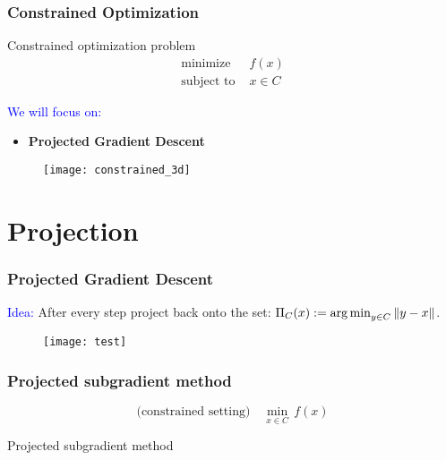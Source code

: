\documentclass{beamer}
\begin{document}
\begin{frame}
  \frametitle{Constrained Optimization}

  \begin{minipage}{0.5\textwidth}
    \begin{block}{Constrained optimization problem}
      \begin{equation}
        \begin{aligned}
          \text{minimize } & f(x)\\
          \text{subject to } & x\in C
        \end{aligned}
      \end{equation}
      \end{block}
      \textcolor{blue}{We will focus on:}
      \begin{itemize}
        \item \textbf{Projected Gradient Descent}
      \end{itemize}
  \end{minipage}
  \begin{minipage}{0.45\textwidth}
    \begin{figure}[ht]
      \centering
      \texttt{[image: constrained\_3d]}
    \end{figure}
  \end{minipage}
\end{frame}

\section{Projection}%
\label{sec:}

\begin{frame}
  \frametitle{Projected Gradient Descent}

  \textcolor{blue}{Idea:} After every step project back onto the set: $\Pi_C(x) :=\operatorname*{arg\,min}_{y\in C} \Vert y-x \Vert$.

    \begin{figure}[ht]
      \centering
      \texttt{[image: test]}
    \end{figure}

\end{frame}


\begin{frame}
  \frametitle{Projected subgradient method}
  \begin{equation}
    \text{(constrained setting)} \quad \min_{x\in C}\, f(x)
  \end{equation}
  \begin{algorithm}[H]
    \caption{Projected subgradient method}\label{label:}
    \begin{algorithmic}[1]
      \EndFor
    \end{algorithmic}
  \end{algorithm}
\end{frame}
\end{document}
